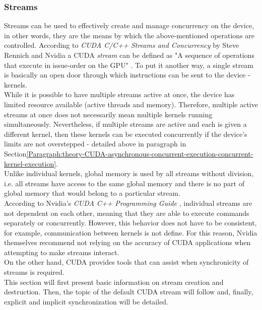 \subsubsection{Streams}\label{Subsubsection:theory-CUDA-asynchronous-concurrent-execution-concurrent-streams}
Streams can be used to effectively create and manage concurrency on the device, in other words, they are the means by which the above-mentioned operations are controlled. According to \emph{CUDA C/C++ Streams and Concurrency} by Steve Rennich and Nvidia a CUDA \textit{stream} can be defined as "A sequence of operations that execute in issue-order on the GPU" \cite{sk7jHd5INXJOAEUe}. To put it another way, a single stream is basically an open door through which instructions can be sent to the device - kernels. \\
While it is possible to have multiple streams active at once, the device has limited resource available (active threads and memory). Therefore, multiple active streams at once does not necessarily mean multiple kernels running simultaneously. Nevertheless, if multiple streams are active and each is given a different kernel, then these kernels can be executed concurrently if the device's limits are not overstepped - detailed above in paragraph \textit{} in Section\ref{Paragraph:theory-CUDA-asynchronous-concurrent-execution-concurrent-kernel-execution}. \\
Unlike individual kernels, global memory is used by all streams without division, i.e. all streams have access to the same global memory and there is no part of global memory that would belong to a particular stream. \\
According to Nvidia's \emph{CUDA C++ Programming Guide} \cite{NVIDIAMay2022}, individual streams are not dependent on each other, meaning that they are able to execute commands separately or concurrently. However, this behavior does not have to be consistent, for example, communication between kernels is not define. For this reason, Nvidia themselves recommend not relying on the accuracy of CUDA applications when attempting to make streams interact. \\
On the other hand, CUDA provides tools that can assist when synchronicity of streams is required. \\
This section will first present basic information on stream creation and destruction. Then, the topic of the default CUDA stream will follow and, finally, explicit and implicit synchronization will be detailed.

